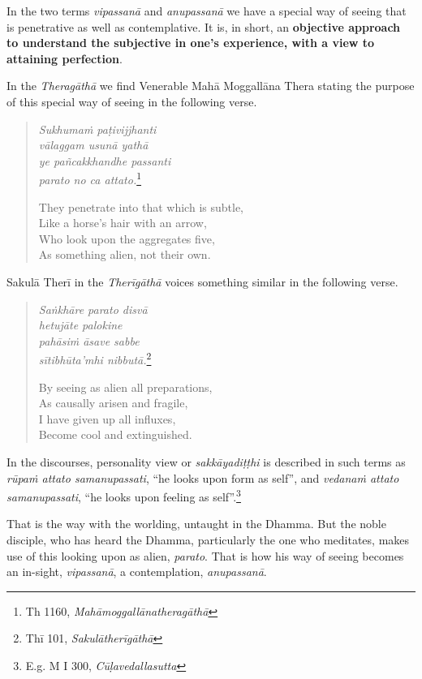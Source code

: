 In the two terms \emph{vipassanā} and \emph{anupassanā} we have a special way of seeing that is penetrative as well as contemplative. It is, in short, an \textbf{objective approach to understand the subjective in one's experience, with a view to attaining perfection}.

In the \emph{Theragāthā} we find Venerable Mahā Moggallāna Thera stating the purpose of this special way of seeing in the following verse.

\begin{quote}
\emph{Sukhumaṁ paṭivijjhanti}\\
\emph{vālaggam usunā yathā}\\
\emph{ye pañcakkhandhe passanti}\\
\emph{parato no ca attato.}\footnote{Th 1160, \emph{Mahāmoggallānatheragāthā}}

They penetrate into that which is subtle,\\
Like a horse's hair with an arrow,\\
Who look upon the aggregates five,\\
As something alien, not their own.
\end{quote}

Sakulā Therī in the \emph{Therīgāthā} voices something similar in the following verse.

\begin{quote}
\emph{Saṅkhāre parato disvā}\\
\emph{hetujāte palokine}\\
\emph{pahāsiṁ āsave sabbe}\\
\emph{sītibhūta'mhi nibbutā.}\footnote{Thī 101, \emph{Sakulātherīgāthā}}

By seeing as alien all preparations,\\
As causally arisen and fragile,\\
I have given up all influxes,\\
Become cool and extinguished.
\end{quote}

In the discourses, personality view or \emph{sakkāyadiṭṭhi} is described in such terms as \emph{rūpaṁ attato samanupassati}, ``he looks upon form as self'', and \emph{vedanaṁ attato samanupassati}, ``he looks upon feeling as self''.\footnote{E.g. M I 300, \emph{Cūḷavedallasutta}}

That is the way with the worlding, untaught in the Dhamma. But the noble disciple, who has heard the Dhamma, particularly the one who meditates, makes use of this looking upon as alien, \emph{parato}. That is how his way of seeing becomes an in-sight, \emph{vipassanā}, a contemplation, \emph{anupassanā}.

